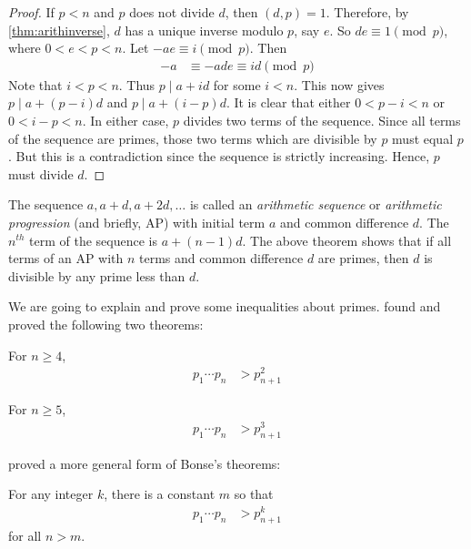 \begin{proof}
	If $p<n$ and $p$ does not divide $d$, then $(d,p)=1$. Therefore, by \autoref{thm:arithinverse}, $d$ has a unique inverse modulo $p$, say $e$. So $de\equiv1\pmod p$, where $0<e<p<n$. Let $-ae \equiv i \pmod p$. Then
		\begin{align*}
			-a & \equiv -ade \equiv id \pmod p
		\end{align*}
	Note that $i<p<n$. Thus $p\mid a+id$ for some $i<n$. This now gives $p\mid a+(p-i)d$ and $p\mid a+(i-p)d$. It is clear that either $0<p-i<n$ or $0<i-p<n$. In either case, $p$ divides two terms of the sequence. Since all terms of the sequence are primes, those two terms which are divisible by $p$ must equal $p$. But this is a contradiction since the sequence is strictly increasing. Hence, $p$ must divide $d$.
\end{proof}

\begin{remark}
	The sequence $a, a+d, a+2d, \ldots$ is called an \textit{arithmetic sequence} or \textit{arithmetic progression} (and briefly, AP) with initial term $a$ and common difference $d$. The $n^{th}$ term of the sequence is $a+(n-1)d$. The above theorem shows that if all terms of an AP with $n$ terms and common difference $d$ are primes, then $d$ is divisible by any prime less than $d$.
\end{remark}

We are going to explain and prove some inequalities about primes. \textcite{bonse_1907} found and proved the following two theorems:
\begin{theorem}\label{thm:bonse1}
	For $n\geq 4$,
		\begin{align*}
			p_1\cdots p_n
				& >p_{n+1}^2
		\end{align*}
\end{theorem}

\begin{theorem}\label{thm:bonse2}
	For $n \geq 5$,
		\begin{align*}
			p_1\cdots p_n
				& >p_{n+1}^3
		\end{align*}
\end{theorem}

\textcite{posa_1960} proved a more general form of Bonse's theorems:
\begin{theorem}
	\label{thm:posa}
	For any integer $k$, there is a constant $m$ so that
		\begin{align*}
			p_1\cdots p_n
				& >p_{n+1}^k
		\end{align*}
	for all $n>m$.
\end{theorem}

